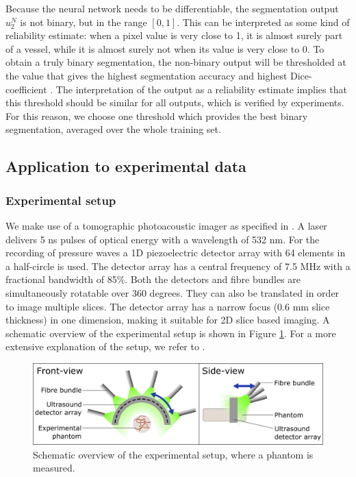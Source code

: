 \documentclass[journal]{IEEEtran}
\begin{document}
Because the neural network needs to be differentiable, the segmentation output $u_2^N$ is not binary, but in the range $[0,1]$. This can be interpreted as some kind of reliability estimate: when a pixel value is very close to 1, it is almost surely part of a vessel, while it is almost surely not when its value is very close to 0. To obtain a truly binary segmentation, the non-binary output will be thresholded at the value that gives the highest segmentation accuracy and highest Dice-coefficient \cite{Zijdenbos1994}. The interpretation of the output as a reliability estimate implies that this threshold should be similar for all outputs, which is verified by experiments. For this reason, we choose one threshold which provides the best binary segmentation, averaged over the whole training set.

\subsection{Application to experimental data}\label{sec:exp_phantom}

\subsubsection{Experimental setup}
We make use of a tomographic photoacoustic imager as specified in \cite{Es2015}. A laser delivers 5 ns pulses of optical energy with a wavelength of 532 nm. For the recording of pressure waves a 1D piezoelectric detector array with 64 elements in a half-circle is used. The detector array has a central frequency of 7.5 MHz with a fractional bandwidth of 85\%. Both the detectors and fibre bundles are simultaneously rotatable over 360 degrees. They can also be translated in order to image multiple slices. The detector array has a narrow focus (0.6 mm slice thickness) in one dimension, making it suitable for 2D slice based imaging. A schematic overview of the experimental setup is shown in Figure \ref{fig:exp_setup}. For a more extensive explanation of the setup, we refer to \cite{Es2015}.

\begin{figure}[!ht]
\centering
\includegraphics[width=\linewidth]{images/Experimental_setup4.png}
\caption{Schematic overview of the experimental setup, where a phantom is measured.}
\label{fig:exp_setup}
\end{figure}
\end{document}
